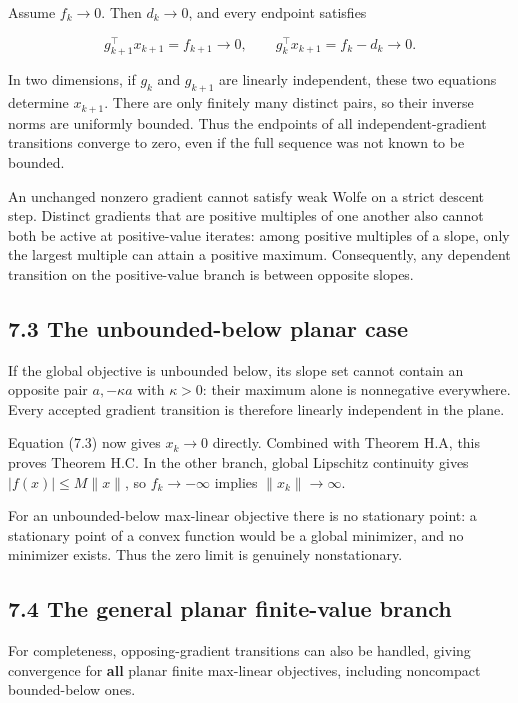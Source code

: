 \documentclass[10pt,oneside,openany]{book}
\theoremstyle{remark}\newtheorem{remark}{Remark}[chapter]
\begin{document}
Assume \(f_k\to0\). Then \(d_k\to0\), and every endpoint satisfies

\[
g_{k+1}^\top x_{k+1}=f_{k+1}\longrightarrow0,
\qquad
g_k^\top x_{k+1}=f_k-d_k\longrightarrow0.
\tag{H.7.3}
\]

In two dimensions, if \(g_k\) and \(g_{k+1}\) are linearly independent,
these two equations determine \(x_{k+1}\). There are only finitely many
distinct pairs, so their inverse norms are uniformly bounded. Thus the
endpoints of all independent-gradient transitions converge to zero, even
if the full sequence was not known to be bounded.

An unchanged nonzero gradient cannot satisfy weak Wolfe on a strict
descent step. Distinct gradients that are positive multiples of one
another also cannot both be active at positive-value iterates: among
positive multiples of a slope, only the largest multiple can attain a
positive maximum. Consequently, any dependent transition on the
positive-value branch is between opposite slopes.

\subsection{7.3 The unbounded-below planar
case}\label{H:the-unbounded-below-planar-case}

If the global objective is unbounded below, its slope set cannot contain
an opposite pair \(a,-\kappa a\) with \(\kappa>0\): their maximum alone
is nonnegative everywhere. Every accepted gradient transition is
therefore linearly independent in the plane.

Equation (7.3) now gives \(x_k\to0\) directly. Combined with Theorem H.A,
this proves Theorem H.C. In the other branch, global Lipschitz continuity
gives \(|f(x)|\le M\|x\|\), so \(f_k\to-\infty\) implies
\(\|x_k\|\to\infty\).

For an unbounded-below max-linear objective there is no stationary
point: a stationary point of a convex function would be a global
minimizer, and no minimizer exists. Thus the zero limit is genuinely
nonstationary.

\subsection{7.4 The general planar finite-value
branch}\label{H:the-general-planar-finite-value-branch}

For completeness, opposing-gradient transitions can also be handled,
giving convergence for \textbf{all} planar finite max-linear objectives,
including noncompact bounded-below ones.
\end{document}
